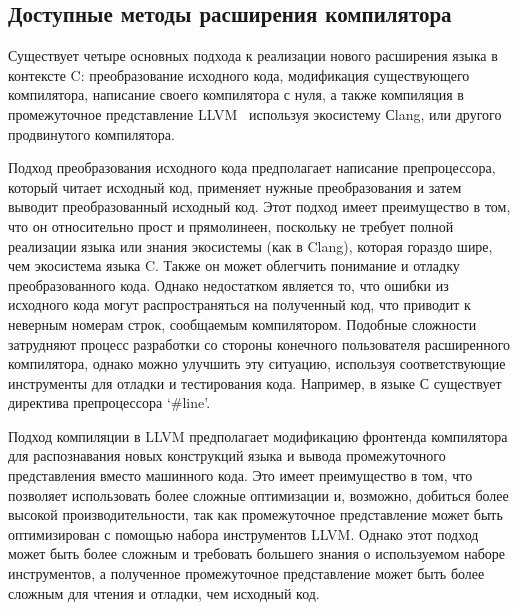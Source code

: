 
\subsection{Доступные методы расширения компилятора}

Существует четыре основных подхода к реализации нового расширения языка в контексте C: преобразование исходного кода, модификация существующего компилятора, написание своего компилятора с нуля, а также компиляция в промежуточное представление LLVM~\cite{llvm} используя экосистему Сlang, или другого продвинутого компилятора.

Подход преобразования исходного кода предполагает написание препроцессора, который читает исходный код, применяет нужные преобразования и затем выводит преобразованный исходный код.
Этот подход имеет преимущество в том, что он относительно прост и прямолинеен, поскольку не требует полной реализации языка или знания экосистемы (как в Clang), которая гораздо шире, чем экосистема языка C.
Также он может облегчить понимание и отладку преобразованного кода.
Однако недостатком является то, что ошибки из исходного кода могут распространяться на полученный код, что приводит к неверным номерам строк, сообщаемым компилятором.
Подобные сложности затрудняют процесс разработки со стороны конечного пользователя расширенного компилятора, однако можно улучшить эту ситуацию, используя соответствующие инструменты для отладки и тестирования кода.
Например, в языке С существует директива препроцессора `\#line'.



Подход компиляции в LLVM предполагает модификацию фронтенда компилятора для распознавания новых конструкций языка и вывода промежуточного представления вместо машинного кода.
Это имеет преимущество в том, что позволяет использовать более сложные оптимизации и, возможно, добиться более высокой производительности, так как промежуточное представление может быть оптимизирован с помощью набора инструментов LLVM.
Однако этот подход может быть более сложным и требовать большего знания о используемом наборе инструментов, а полученное промежуточное представление может быть более сложным для чтения и отладки, чем исходный код.

